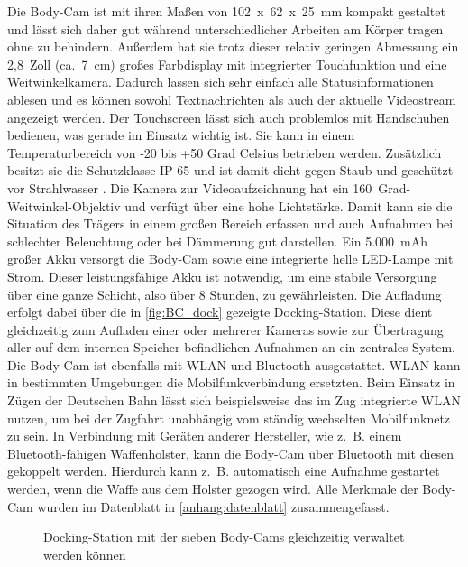 \documentclass[thesis.tex]{subfiles}
\begin{document}
Die Body-Cam ist mit ihren Maßen von 102~x~62~x~25~mm kompakt gestaltet und lässt sich daher gut während unterschiedlicher Arbeiten am Körper tragen ohne zu behindern.
Außerdem hat sie trotz dieser relativ geringen Abmessung ein 2,8~Zoll (ca.~7~cm) großes Farbdisplay mit integrierter Touchfunktion und eine Weitwinkelkamera. Dadurch lassen sich sehr einfach alle Statusinformationen ablesen und es können sowohl Textnachrichten als auch der aktuelle Videostream angezeigt werden.
Der Touchscreen lässt sich auch problemlos mit Handschuhen bedienen, was gerade im Einsatz wichtig ist.
Sie kann in einem Temperaturbereich von -20 bis +50 Grad Celsius betrieben werden.
Zusätzlich besitzt sie die Schutzklasse IP 65 und ist damit dicht gegen Staub und geschützt vor Strahlwasser \cite[S.~44][]{Elektro_Baugruppen}.
Die Kamera zur Videoaufzeichnung hat ein 160~Grad-Weitwinkel-Objektiv und verfügt über eine hohe Lichtstärke.
Damit kann sie die Situation des Trägers in einem großen Bereich erfassen und auch Aufnahmen bei schlechter Beleuchtung oder bei Dämmerung gut darstellen.
Ein 5.000~mAh großer Akku versorgt die Body-Cam sowie eine integrierte helle LED-Lampe mit Strom.
Dieser leistungsfähige Akku ist notwendig, um eine stabile Versorgung über eine ganze Schicht, also über 8 Stunden, zu gewährleisten.
Die Aufladung erfolgt dabei über die in \autoref{fig:BC_dock} gezeigte Docking-Station.
Diese dient gleichzeitig zum Aufladen einer oder mehrerer Kameras sowie zur Übertragung aller auf dem internen Speicher befindlichen Aufnahmen an ein zentrales System.
Die Body-Cam ist ebenfalls mit WLAN und Bluetooth ausgestattet.
WLAN kann in bestimmten Umgebungen die Mobilfunkverbindung ersetzten.
Beim Einsatz in Zügen der Deutschen Bahn lässt sich beispielsweise das im Zug integrierte WLAN nutzen, um bei der Zugfahrt unabhängig vom ständig wechselten Mobilfunknetz zu sein.
In Verbindung mit Geräten anderer Hersteller, wie z.~B. einem Bluetooth-fähigen Waffenholster, kann die Body-Cam über Bluetooth mit diesen gekoppelt werden.
Hierdurch kann z.~B. automatisch eine Aufnahme gestartet werden, wenn die Waffe aus dem Holster gezogen wird.
Alle Merkmale der Body-Cam wurden im Datenblatt in \autoref{anhang:datenblatt} zusammengefasst.

\begin{figure}[h]
    \centering
    \qquad
    \caption[Docking-Station mit der sieben Body-Cams gleichzeitig verwaltet werden können]{Docking-Station mit der sieben Body-Cams gleichzeitig verwaltet werden können \cite{netco}}
    \label{fig:BC_docking_7}
\end{figure}
\end{document}
